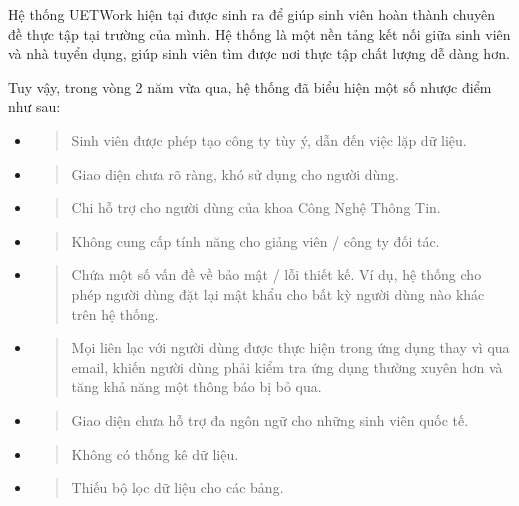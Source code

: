 \documentclass[./../main.tex]{subfiles}
\begin{document}
Hệ thống UETWork hiện tại được sinh ra để giúp sinh viên hoàn thành
chuyên đề thực tập tại trường của mình. Hệ thống là một nền tảng kết nối
giữa sinh viên và nhà tuyển dụng, giúp sinh viên tìm được nơi thực tập
chất lượng dễ dàng hơn.

Tuy vậy, trong vòng 2 năm vừa qua, hệ thống đã biểu hiện một số nhược
điểm như sau:

\begin{itemize}
\item
  \begin{quote}
  Sinh viên được phép tạo công ty tùy ý, dẫn đến việc lặp dữ liệu.
  \end{quote}
\item
  \begin{quote}
  Giao diện chưa rõ ràng, khó sử dụng cho người dùng.
  \end{quote}
\item
  \begin{quote}
  Chi hỗ trợ cho người dùng của khoa Công Nghệ Thông Tin.
  \end{quote}
\item
  \begin{quote}
  Không cung cấp tính năng cho giảng viên / công ty đối tác.
  \end{quote}
\item
  \begin{quote}
  Chứa một số vấn đề về bảo mật / lỗi thiết kế. Ví dụ, hệ thống cho phép
  người dùng đặt lại mật khẩu cho bất kỳ người dùng nào khác trên hệ
  thống.
  \end{quote}
\item
  \begin{quote}
  Mọi liên lạc với người dùng được thực hiện trong ứng dụng thay vì qua
  email, khiến người dùng phải kiểm tra ứng dụng thường xuyên hơn và
  tăng khả năng một thông báo bị bỏ qua.
  \end{quote}
\item
  \begin{quote}
  Giao diện chưa hỗ trợ đa ngôn ngữ cho những sinh viên quốc tế.
  \end{quote}
\item
  \begin{quote}
  Không có thống kê dữ liệu.
  \end{quote}
\item
  \begin{quote}
  Thiếu bộ lọc dữ liệu cho các bảng.
  \end{quote}
\end{itemize}
\end{document}
